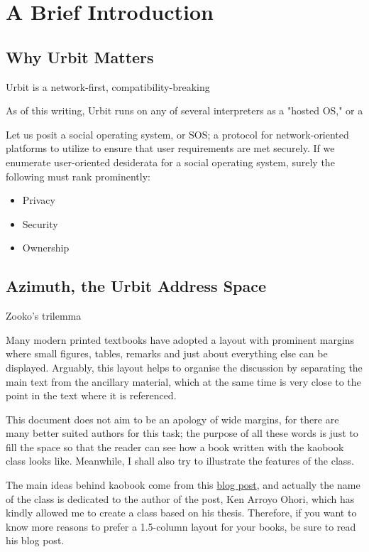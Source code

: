 \setchapterpreamble[u]{\margintoc}
\chapter{A Brief Introduction}


\section{Why Urbit Matters}

Urbit is a  network-first,
compatibility-breaking

As of this writing, Urbit runs on any of several interpreters as a "hosted OS," or a


Let us posit a social operating system, or SOS;  a protocol for network-oriented platforms to utilize to ensure that user requirements are met securely.  If we enumerate user-oriented desiderata for a social operating system, surely the following must rank prominently:

\begin{itemize}
	\item  Privacy
	\item  Security
	\item  Ownership
\end{itemize}


\section{Azimuth, the Urbit Address Space}


Zooko's trilemma


Many modern printed textbooks have adopted a layout with prominent
margins where small figures, tables, remarks and just about everything
else can be displayed. Arguably, this layout helps to organise the
	discussion by separating the main text from the ancillary material,
	which at the same time is very close to the point in the text where
	it is referenced.

This document does not aim to be an apology of wide margins, for there
are many better suited authors for this task; the purpose of all these
words is just to fill the space so that the reader can see how a book
written with the kaobook class looks like. Meanwhile, I shall also try
to illustrate the features of the class.

The main ideas behind kaobook come from this
\href{https://3d.bk.tudelft.nl/ken/en/2016/04/17/a-1.5-column-layout-in-latex.html}{blog
	post}, and actually the name of the class is dedicated to the author
of the post, Ken Arroyo Ohori, which has kindly allowed me to create a
class based on his thesis. Therefore, if you want to know more reasons
to prefer a 1.5-column layout for your books, be sure to read his blog
post.

